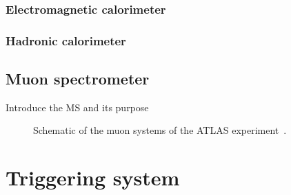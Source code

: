 \FloatBarrier
\subsubsection{Electromagnetic calorimeter} 

\FloatBarrier
\subsubsection{Hadronic calorimeter} 

\FloatBarrier
\subsection{Muon spectrometer} 

{\color{red} Introduce the MS and its purpose}

\begin{figure}[ht]
  \caption{
    Schematic of the muon systems of the ATLAS
    experiment~\cite{Pequenao:1095929}.
  }
  \label{fig:ms_cartoon}
\end{figure}


\FloatBarrier
\section{Triggering system}


